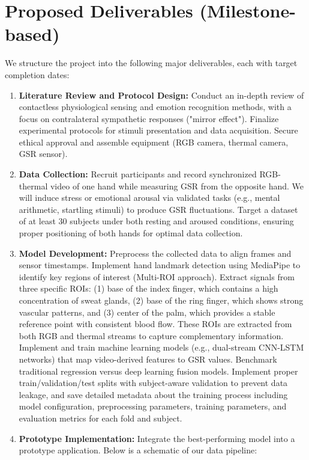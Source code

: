     \section{Proposed Deliverables (Milestone-based)}
    We structure the project into the following major deliverables, each with target completion dates:
    \begin{enumerate}
        \item \textbf{Literature Review and Protocol Design:} Conduct an in-depth review of contactless physiological sensing and emotion recognition methods, with a focus on contralateral sympathetic responses ("mirror effect"). Finalize experimental protocols for stimuli presentation and data acquisition. Secure ethical approval and assemble equipment (RGB camera, thermal camera, GSR sensor).
        \item \textbf{Data Collection:} Recruit participants and record synchronized RGB-thermal video of one hand while measuring GSR from the opposite hand. We will induce stress or emotional arousal via validated tasks (e.g., mental arithmetic, startling stimuli) to produce GSR fluctuations. Target a dataset of at least 30 subjects under both resting and aroused conditions, ensuring proper positioning of both hands for optimal data collection.
        \item \textbf{Model Development:} Preprocess the collected data to align frames and sensor timestamps. Implement hand landmark detection using MediaPipe to identify key regions of interest (Multi-ROI approach). Extract signals from three specific ROIs: (1) base of the index finger, which contains a high concentration of sweat glands, (2) base of the ring finger, which shows strong vascular patterns, and (3) center of the palm, which provides a stable reference point with consistent blood flow. These ROIs are extracted from both RGB and thermal streams to capture complementary information. Implement and train machine learning models (e.g., dual-stream CNN-LSTM networks) that map video-derived features to GSR values. Benchmark traditional regression versus deep learning fusion models. Implement proper train/validation/test splits with subject-aware validation to prevent data leakage, and save detailed metadata about the training process including model configuration, preprocessing parameters, training parameters, and evaluation metrics for each fold and subject.
        \item \textbf{Prototype Implementation:} Integrate the best-performing model into a prototype application. Below is a schematic of our data pipeline:

\end{enumerate}
